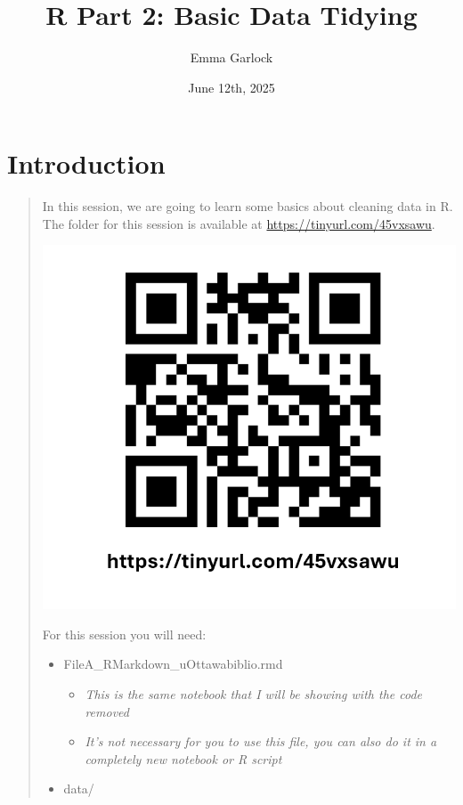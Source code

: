 \documentclass[
]{article}
\title{R Part 2: Basic Data Tidying}
\author{Emma Garlock}
\date{June 12th, 2025}
\providecommand{\tightlist}{%
  \setlength{\itemsep}{0pt}\setlength{\parskip}{0pt}}
\begin{document}
\maketitle

{
\setcounter{tocdepth}{2}
\tableofcontents
}
\section{Introduction}\label{introduction}

\begin{quote}
In this session, we are going to learn some basics about cleaning data
in R. The folder for this session is available at
\url{https://tinyurl.com/45vxsawu}.

\includegraphics{notebook_images/QR.png}

For this session you will need:

\begin{itemize}
\tightlist
\item
  FileA\_RMarkdown\_uOttawabiblio.rmd

  \begin{itemize}
  \tightlist
  \item
    \emph{This is the same notebook that I will be showing with the code
    removed}
  \item
    \emph{It's not necessary for you to use this file, you can also do
    it in a completely new notebook or R script}
  \end{itemize}
\item
  data/


\end{itemize}
\end{quote}
\end{document}
